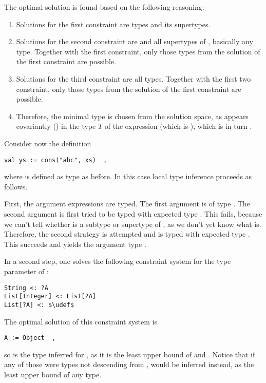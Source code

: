 The optimal solution is found based on the following reasoning: 
\begin{enumerate}
  \item Solutions for the first constraint are types  and its supertypes.
  \item Solutions for the second constraint are  and all supertypes of , basically any type. Together with the first constraint, only those types from the solution of the first constraint are possible. 
  \item Solutions for the third constraint are all types. Together with the first two constraint, only those types from the solution of the first constraint are possible. 
  \item Therefore, the minimal type is chosen from the solution space, as  appears covariantly () in the type $T$ of the expression (which is ), which is in turn . 
\end{enumerate}

\example Consider now the definition
\begin{lstlisting}
val ys := cons("abc", xs)  ,
\end{lstlisting}
where  is defined as type  as before. In this case local type inference proceeds as follows.

First, the argument expressions are typed. The first argument  is of type . The second argument  is first tried to be typed with expected type . This fails, because we can't tell whether  is a subtype or supertype of , as we don't yet know what  is. Therefore, the second strategy is attempted and  is typed with expected type . This succeeds and yields the argument type .

In a second step, one solves the following constraint system for the type parameter  of :
\begin{lstlisting}
String <: ?A
List[Integer] <: List[?A]
List[?A] <: $\udef$
\end{lstlisting}

The optimal solution of this constraint system is
\begin{lstlisting}
A := Object  ,
\end{lstlisting}
so  is the type inferred for , as it is the least upper bound of  and . Notice that if any of those were types not descending from ,  would be inferred instead, as the least upper bound of any type. 

